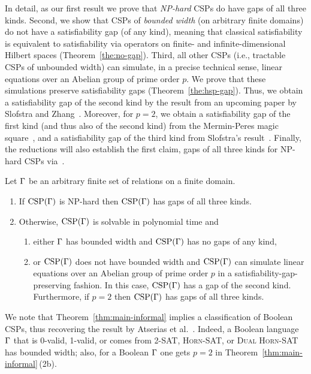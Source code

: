 \documentclass[11pt,letter]{article}
\begin{document}
In detail, as our first result we prove that 
\emph{NP-hard} CSPs do have gaps of all three kinds. Second, we show that CSPs of \emph{bounded width} (on arbitrary finite domains) do not have a
satisfiability gap (of any kind), meaning that classical satisfiability is
equivalent to satisfiability via operators on finite- and infinite-dimensional
Hilbert spaces (Theorem~\ref{the:no-gap}). Third, all other CSPs (i.e.,
tractable CSPs of unbounded width) can simulate, in a
precise technical sense, linear equations over an Abelian group of prime order
$p$. We prove that these simulations preserve
satisfiability gaps (Theorem~\ref{the:hsp-gap}).
Thus, we obtain a satisfiability
gap of the second kind by the result from an upcoming paper by Slofstra and
Zhang~\cite{SZ24:personal}.
Moreover, for $p=2$, we obtain a satisfiability
gap of the first kind (and thus also of the second kind) from the Mermin-Peres magic
square~\cite{Mermin1990simple,Mermin1993hidden,Peres1990incompatible}, and a 
satisfiability gap of the third kind from Slofstra's
result~\cite{Slofstra20:jams}. Finally, the reductions will also establish the
first claim, gaps of all three kinds for NP-hard CSPs
via~\cite{Mermin1990simple,Mermin1993hidden,Peres1990incompatible,Slofstra20:jams}.

\begin{theorem}\label{thm:main-informal}
  Let $\Gamma$ be an arbitrary finite set of relations on a finite domain. 
  \begin{enumerate}
  \item If ${\rm CSP}(\Gamma)$ is NP-hard then ${\rm CSP}(\Gamma)$ has gaps of all three kinds.
  \item Otherwise, ${\rm CSP}(\Gamma)$ is solvable in polynomial time and
  \begin{enumerate}
  \item either $\Gamma$ has bounded width and ${\rm CSP}(\Gamma)$ has no gaps of any kind,
  \item or ${\rm CSP}(\Gamma)$ does not have bounded width and ${\rm CSP}(\Gamma)$ can simulate linear equations over an Abelian
    group of prime order $p$ in a satisfiability-gap-preserving fashion. In this
    case, ${\rm CSP}(\Gamma)$ has a gap of the second kind. Furthermore, if $p=2$ then
    ${\rm CSP}(\Gamma)$ has gaps of all three kinds. 
  \end{enumerate} 
  \end{enumerate}
\end{theorem}

We note that Theorem~\ref{thm:main-informal} implies a classification of Boolean
CSPs, thus recovering the result by Atserias et al.~\cite{AKS19:jcss}. Indeed,
a Boolean language $\Gamma$ that is 0-valid, 1-valid, or comes from
\textsc{2-SAT}, \textsc{Horn-SAT}, or \textsc{Dual Horn-SAT} has bounded
width; also, for a Boolean $\Gamma$ one gets $p=2$ in
Theorem~\ref{thm:main-informal}\,(2b).
\end{document}
